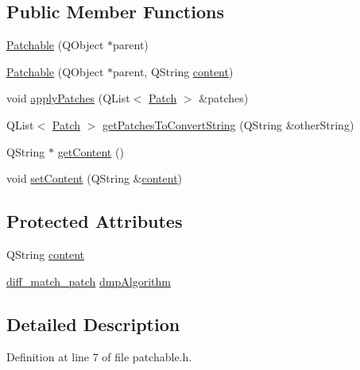\subsection*{Public Member Functions}
\begin{DoxyCompactItemize}
\item 
\hyperlink{class_patchable_a2b2d8a1b4243442461055aa68fe9af18}{Patchable} (QObject $\ast$parent)
\item 
\hyperlink{class_patchable_a746675deed66e1b1aed3a7760d6427d6}{Patchable} (QObject $\ast$parent, QString \hyperlink{class_patchable_a4c55c830faef821364995f097c96d34d}{content})
\item 
void \hyperlink{class_patchable_a38e7876689db45f8e3a45d65ccdc6009}{applyPatches} (QList$<$ \hyperlink{class_patch}{Patch} $>$ \&patches)
\item 
QList$<$ \hyperlink{class_patch}{Patch} $>$ \hyperlink{class_patchable_ab3016a99f60b10bae143365fb2cf1450}{getPatchesToConvertString} (QString \&otherString)
\item 
QString $\ast$ \hyperlink{class_patchable_a5abdd9e99d4ab7287cd1f47b23294bea}{getContent} ()
\item 
void \hyperlink{class_patchable_aa386892c91c1718cd5151ccc491e1bbf}{setContent} (QString \&\hyperlink{class_patchable_a4c55c830faef821364995f097c96d34d}{content})
\end{DoxyCompactItemize}
\subsection*{Protected Attributes}
\begin{DoxyCompactItemize}
\item 
QString \hyperlink{class_patchable_a4c55c830faef821364995f097c96d34d}{content}
\item 
\hyperlink{classdiff__match__patch}{diff\_\-match\_\-patch} \hyperlink{class_patchable_a3fd21cfdd40012979695e7aefe76558b}{dmpAlgorithm}
\end{DoxyCompactItemize}


\subsection{Detailed Description}


Definition at line 7 of file patchable.h.



